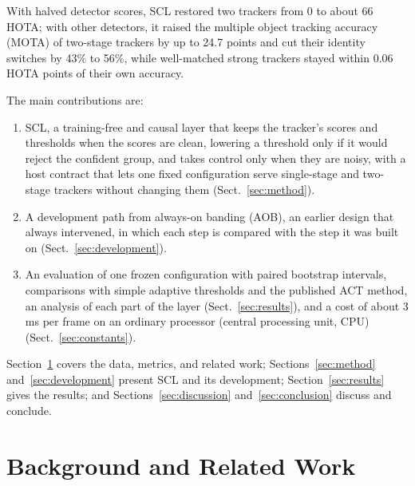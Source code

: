 \documentclass[pdflatex,sn-mathphys-num,iicol]{sn-jnl}
\newcommand{\scl}{SCL}
\newcommand{\aob}{AOB}
\begin{document}
With halved detector scores, \scl{} restored two trackers from 0 to about 66 HOTA; with other
detectors, it raised the multiple object tracking accuracy (MOTA) of two-stage trackers by up to
24.7 points and cut their identity switches by 43\% to 56\%, while well-matched strong trackers
stayed within 0.06 HOTA points of their own accuracy.

The main contributions are:
\begin{enumerate}
\item \scl{}, a training-free and causal layer that keeps the tracker's scores and thresholds when
      the scores are clean, lowering a threshold only if it would reject the confident group, and
      takes control only when they are noisy, with a host contract that lets one fixed
      configuration serve single-stage and two-stage trackers without changing them
      (Sect.~\ref{sec:method}).
\item A development path from always-on banding (\aob{}), an earlier design that always
      intervened, in which each step is compared with the step it was built on
      (Sect.~\ref{sec:development}).
\item An evaluation of one frozen configuration with paired bootstrap intervals, comparisons with
      simple adaptive thresholds and the published ACT method, an analysis of each part of the
      layer (Sect.~\ref{sec:results}), and a cost of about 3 ms per frame on an ordinary processor
      (central processing unit, CPU) (Sect.~\ref{sec:constants}).
\end{enumerate}

Section~\ref{sec:related} covers the data, metrics, and related work;
Sections~\ref{sec:method} and~\ref{sec:development} present \scl{} and its development;
Section~\ref{sec:results} gives the results; and Sections~\ref{sec:discussion}
and~\ref{sec:conclusion} discuss and conclude.
\section{Background and Related Work}\label{sec:related}
\end{document}
